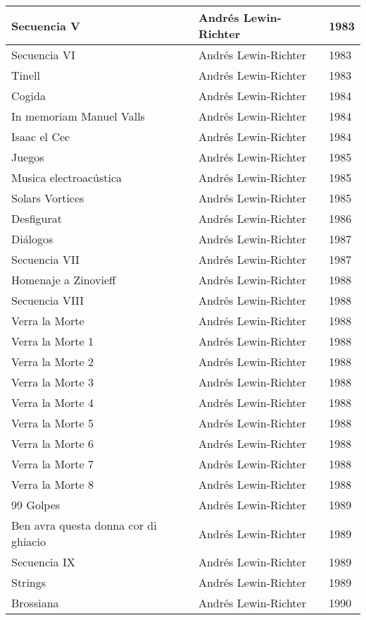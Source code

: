 \begin{center}
\begin{longtable}{| p{} | p{} | p{} |}
Secuencia V & Andrés Lewin-Richter & 1983 \\ \hline 
Secuencia VI & Andrés Lewin-Richter & 1983 \\ \hline 
Tinell & Andrés Lewin-Richter & 1983 \\ \hline 
Cogida & Andrés Lewin-Richter & 1984 \\ \hline 
In memoriam Manuel Valls & Andrés Lewin-Richter & 1984 \\ \hline 
Isaac el Cec & Andrés Lewin-Richter & 1984 \\ \hline 
Juegos & Andrés Lewin-Richter & 1985 \\ \hline 
Musica electroacústica & Andrés Lewin-Richter & 1985 \\ \hline 
Solars Vortices & Andrés Lewin-Richter & 1985 \\ \hline 
Desfigurat & Andrés Lewin-Richter & 1986 \\ \hline 
Diálogos & Andrés Lewin-Richter & 1987 \\ \hline 
Secuencia VII & Andrés Lewin-Richter & 1987 \\ \hline 
Homenaje a Zinovieff & Andrés Lewin-Richter & 1988 \\ \hline 
Secuencia VIII & Andrés Lewin-Richter & 1988 \\ \hline 
Verra la Morte & Andrés Lewin-Richter & 1988 \\ \hline 
Verra la Morte 1 & Andrés Lewin-Richter & 1988 \\ \hline 
Verra la Morte 2 & Andrés Lewin-Richter & 1988 \\ \hline 
Verra la Morte 3 & Andrés Lewin-Richter & 1988 \\ \hline 
Verra la Morte 4 & Andrés Lewin-Richter & 1988 \\ \hline 
Verra la Morte 5 & Andrés Lewin-Richter & 1988 \\ \hline 
Verra la Morte 6 & Andrés Lewin-Richter & 1988 \\ \hline 
Verra la Morte 7 & Andrés Lewin-Richter & 1988 \\ \hline 
Verra la Morte 8 & Andrés Lewin-Richter & 1988 \\ \hline 
99 Golpes & Andrés Lewin-Richter & 1989 \\ \hline 
Ben avra questa donna cor di ghiacio & Andrés Lewin-Richter & 1989 \\ \hline 
Secuencia IX & Andrés Lewin-Richter & 1989 \\ \hline 
Strings & Andrés Lewin-Richter & 1989 \\ \hline 
Brossiana & Andrés Lewin-Richter & 1990 \\ \hline 

\end{longtable}
\end{center}
